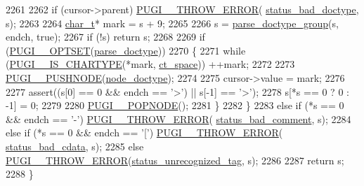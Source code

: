 \begin{DoxyCode}
2261 
2262                 \textcolor{keywordflow}{if} (cursor->parent) \hyperlink{pugixml_8cpp_a8af02d87a10272f03f96ab93a96d7202}{PUGI\_\_THROW\_ERROR}(
      \hyperlink{namespacepugi_a9054ca609e12afb8f3e5892fc6c0b555a58d1b0d8787e97fc1b5b31ec5e4fabcf}{status\_bad\_doctype}, s);
2263 
2264                 \hyperlink{namespacepugi_aef5a7a62cba0507542220ea15afe39df}{char\_t}* mark = s + 9;
2265 
2266                 s = \hyperlink{structxml__parser_a9bc0e5f3d75cd7edb267a85430e1cdfc}{parse\_doctype\_group}(s, endch, \textcolor{keyword}{true});
2267                 \textcolor{keywordflow}{if} (!s) \textcolor{keywordflow}{return} s;
2268 
2269                 \textcolor{keywordflow}{if} (\hyperlink{pugixml_8cpp_a06966692c7864407ceffff065b4d7da2}{PUGI\_\_OPTSET}(\hyperlink{namespacepugi_afa993ffcd3e228d21f48071e7c097f32}{parse\_doctype}))
2270                 \{
2271                     \textcolor{keywordflow}{while} (\hyperlink{pugixml_8cpp_a2adf5ae9b7505408a18e9f3bb1b3d332}{PUGI\_\_IS\_CHARTYPE}(*mark, \hyperlink{pugixml_8cpp_ae83a55e5947d28c62625b690b1484108ac957a1774b6a4430e583bcb881909372}{ct\_space})) ++mark;
2272 
2273                     \hyperlink{pugixml_8cpp_accdd212cd2831662c3c2dda668246f8a}{PUGI\_\_PUSHNODE}(\hyperlink{namespacepugi_a137e94a038e4ab0ada6477cf7f6153a9a9504586a29b181817607cc7ec231c9d4}{node\_doctype});
2274 
2275                     cursor->value = mark;
2276 
2277                     assert((s[0] == 0 && endch == \textcolor{charliteral}{'>'}) || s[-1] == \textcolor{charliteral}{'>'});
2278                     s[*s == 0 ? 0 : -1] = 0;
2279 
2280                     \hyperlink{pugixml_8cpp_ab82f13ed99cc2d22c5ecb6e18b5dfe17}{PUGI\_\_POPNODE}();
2281                 \}
2282             \}
2283             \textcolor{keywordflow}{else} \textcolor{keywordflow}{if} (*s == 0 && endch == \textcolor{charliteral}{'-'}) \hyperlink{pugixml_8cpp_a8af02d87a10272f03f96ab93a96d7202}{PUGI\_\_THROW\_ERROR}(
      \hyperlink{namespacepugi_a9054ca609e12afb8f3e5892fc6c0b555a563327f534e9b3ce55f9f7364aa746b2}{status\_bad\_comment}, s);
2284             \textcolor{keywordflow}{else} \textcolor{keywordflow}{if} (*s == 0 && endch == \textcolor{charliteral}{'['}) \hyperlink{pugixml_8cpp_a8af02d87a10272f03f96ab93a96d7202}{PUGI\_\_THROW\_ERROR}(
      \hyperlink{namespacepugi_a9054ca609e12afb8f3e5892fc6c0b555aa2ebdaf5e8bf5414bec3004270e102b8}{status\_bad\_cdata}, s);
2285             \textcolor{keywordflow}{else} \hyperlink{pugixml_8cpp_a8af02d87a10272f03f96ab93a96d7202}{PUGI\_\_THROW\_ERROR}(\hyperlink{namespacepugi_a9054ca609e12afb8f3e5892fc6c0b555a71a555b91e80b6d8f84aeb6a93904d28}{status\_unrecognized\_tag}, s);
2286 
2287             \textcolor{keywordflow}{return} s;
2288         \}
\end{DoxyCode}
